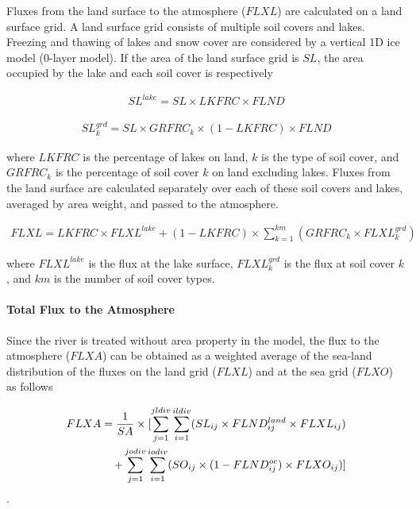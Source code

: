 Fluxes from the land surface to the atmosphere (\(FLXL\)) are calculated on a land surface grid. A land surface grid consists of multiple soil covers and lakes. Freezing and thawing of lakes and snow
cover are considered by a vertical 1D ice model (0-layer model). If the area of the land surface grid is \(SL\), the area occupied by the lake and each soil cover is respectively

\begin{eqnarray} SL^{lake}=SL  \times  LKFRC \times FLND \end{eqnarray}

\begin{eqnarray} SL^{grd}_k = SL \times GRFRC_k \times (1-LKFRC) \times FLND \end{eqnarray}

where \(LKFRC\) is the percentage of lakes on land, \(k\) is the type of soil cover, and \(GRFRC_k\) is the percentage of soil cover \(k\) on land excluding lakes. Fluxes from the land surface are
calculated separately over each of these soil covers and lakes, averaged by area weight, and passed to the atmosphere.

\begin{eqnarray} FLXL = LKFRC \times FLXL^{lake} + (1-LKFRC) \times \sum_{k=1}^{km} (GRFRC_k \times FLXL_k^{grd}) \end{eqnarray}

where \(FLXL^{lake}\) is the flux at the lake surface, \(FLXL_{k}^{grd}\) is the flux at soil cover \(k\), and \(km\) is the number of soil cover types.

\hypertarget{total-flux-to-the-atmosphere}{%
\paragraph{Total Flux to the Atmosphere}\label{total-flux-to-the-atmosphere}}

Since the river is treated without area property in the model, the flux to the atmosphere (\(FLXA\)) can be obtained as a weighted average of the sea-land distribution of the fluxes on the land grid
(\(FLXL\)) and at the sea grid (\(FLXO\)) as follows

\begin{eqnarray} FLXA = \frac{1}{SA} \times [ \sum _ {j=1}^{jldiv} \sum_{i=1}^{ildiv}(SL _ {ij} \times FLND^{land} _ {ij} \times FLXL_{ij}) \notag\\ + \sum _ {j=1}^{jodiv}\sum _ {i=1}^{iodiv }(SO _ {ij} \times (1-FLND^{oc} _ {ij}) \times FLXO _ {ij})] \end{eqnarray}.

